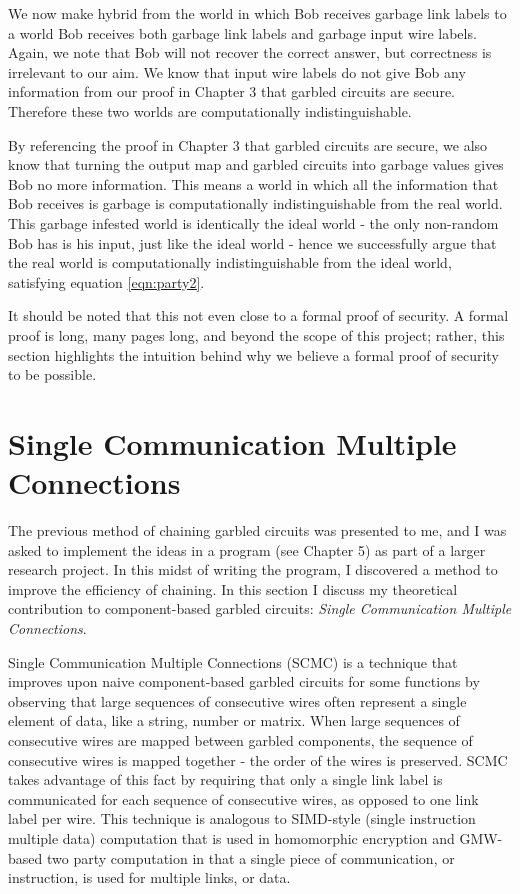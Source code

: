 We now make hybrid from the world in which Bob receives garbage link labels to a world Bob receives both garbage link labels and garbage input wire labels. 
Again, we note that Bob will not recover the correct answer, but correctness is irrelevant to our aim. 
We know that input wire labels do not give Bob any information from our proof in Chapter 3 that garbled circuits are secure. 
Therefore these two worlds are computationally indistinguishable. 

By referencing the proof in Chapter 3 that garbled circuits are secure, we also know that turning the output map and garbled circuits into garbage values gives Bob no more information.
This means a world in which all the information that Bob receives is garbage is computationally indistinguishable from the real world.
This garbage infested world is identically the ideal world - the only non-random Bob has is his input, just like the ideal world - hence we successfully argue that the real world is computationally indistinguishable from the ideal world, satisfying equation \ref{eqn:party2}. 

It should be noted that this not even close to a formal proof of security.
A formal proof is long, many pages long, and beyond the scope of this project; rather, this section highlights the intuition behind why we believe a formal proof of security to be possible. 

\section{Single Communication Multiple Connections}

The previous method of chaining garbled circuits was presented to me, and I was asked to implement the ideas in a program (see Chapter 5) as part of a larger research project. 
In this midst of writing the program, I discovered a method to improve the efficiency of chaining. 
In this section I discuss my theoretical contribution to component-based garbled circuits:  \textit{Single Communication Multiple Connections}.

Single Communication Multiple Connections (SCMC) is a technique that improves upon naive component-based garbled circuits for some functions by observing that large sequences of consecutive wires often represent a single element of data, like a string, number or matrix. 
When large sequences of consecutive wires are mapped between garbled components, the sequence of consecutive wires is mapped together - the order of the wires is preserved. 
SCMC takes advantage of this fact by requiring that only a single link label is communicated for each sequence of consecutive wires, as opposed to one link label per wire. 
This technique is analogous to SIMD-style (single instruction multiple data) computation that is used in homomorphic encryption \cite{SV11} and GMW-based two party computation \cite{DSZ15, SZ13} in that a single piece of communication, or instruction, is used for multiple links, or data. 

